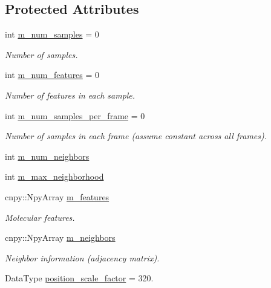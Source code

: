 \subsection*{Protected Attributes}
\begin{DoxyCompactItemize}
\item 
int \hyperlink{classlbann_1_1pilot2__molecular__reader_a9db4542fcce68a2a60ad5aad9d211dee}{m\+\_\+num\+\_\+samples} = 0
\begin{DoxyCompactList}\small\item\em Number of samples. \end{DoxyCompactList}\item 
int \hyperlink{classlbann_1_1pilot2__molecular__reader_a7fd7dac6f280fd8ef92bd5d2ffc89e36}{m\+\_\+num\+\_\+features} = 0
\begin{DoxyCompactList}\small\item\em Number of features in each sample. \end{DoxyCompactList}\item 
int \hyperlink{classlbann_1_1pilot2__molecular__reader_a1aa5896276d8a0576f7b3c2b955130be}{m\+\_\+num\+\_\+samples\+\_\+per\+\_\+frame} = 0
\begin{DoxyCompactList}\small\item\em Number of samples in each frame (assume constant across all frames). \end{DoxyCompactList}\item 
int \hyperlink{classlbann_1_1pilot2__molecular__reader_aaf41323e4da85467de398b4ab4b58c2c}{m\+\_\+num\+\_\+neighbors}
\item 
int \hyperlink{classlbann_1_1pilot2__molecular__reader_a0c9e71035cf47191002d1b164d056f50}{m\+\_\+max\+\_\+neighborhood}
\item 
cnpy\+::\+Npy\+Array \hyperlink{classlbann_1_1pilot2__molecular__reader_a6b273890ecd01754e21be87da68b57bc}{m\+\_\+features}
\begin{DoxyCompactList}\small\item\em Molecular features. \end{DoxyCompactList}\item 
cnpy\+::\+Npy\+Array \hyperlink{classlbann_1_1pilot2__molecular__reader_a0d8dc24b8ea66352a4d45a157b3a3c04}{m\+\_\+neighbors}
\begin{DoxyCompactList}\small\item\em Neighbor information (adjacency matrix). \end{DoxyCompactList}\item 
Data\+Type \hyperlink{classlbann_1_1pilot2__molecular__reader_a0f85cc2fc807d8c7dc6fb4f93db5e09a}{position\+\_\+scale\+\_\+factor} = 320.

\end{DoxyCompactItemize}
